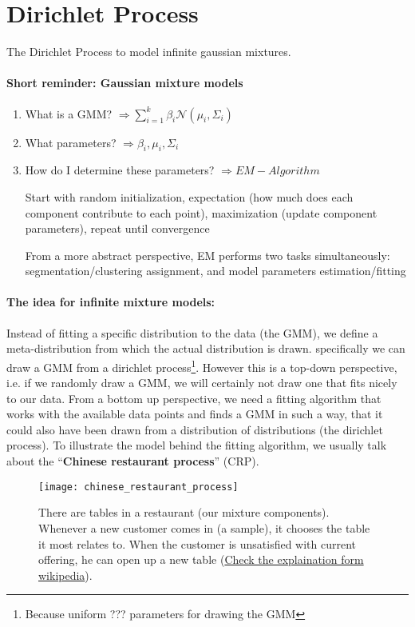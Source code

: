 
\section* {Dirichlet Process}

The Dirichlet Process to model infinite gaussian mixtures.

\paragraph{Short reminder: Gaussian mixture models}
\begin{enumerate}
    \item What is a GMM? \(\Rightarrow \sum_{i=1}^k \beta_i \mathcal{N}(\mu_i, \Sigma_i)\)
    \item What parameters? \(\Rightarrow \beta_i, \mu_i, \Sigma_i\)
    \item How do I determine these parameters? \(\Rightarrow EM-Algorithm\)

          Start with random initialization, expectation (how much does each component contribute to each point), maximization (update component parameters), repeat until convergence

          From a more abstract perspective, EM performs two tasks simultaneously: segmentation/clustering assignment, and model parameters estimation/fitting
\end{enumerate}

\paragraph{The idea for infinite mixture models:}
Instead of fitting a specific distribution to the data (the GMM), we define a meta-distribution from which the actual distribution is drawn.
specifically we can draw a GMM from a dirichlet process\footnote{Because uniform ??? parameters for drawing the GMM}. However this is a top-down perspective, i.e. if we randomly draw a GMM, we will certainly not draw one that fits nicely to our data.
From a bottom up perspective, we need a fitting algorithm that works with the available data points and finds a GMM in such a way, that it could also have been drawn from a distribution of distributions (the dirichlet process).
To illustrate the model behind the fitting algorithm, we usually talk about the ``\textbf{Chinese restaurant process}'' (CRP).

\begin{figure}[H]
	\centering
	\texttt{[image: chinese\_restaurant\_process]}
  \caption{There are tables in a restaurant (our mixture components). Whenever a new customer comes in (a sample), it chooses the table it most relates to. When the customer is unsatisfied with current offering, he can open up a new table (\href{https://en.wikipedia.org/wiki/Chinese_restaurant_process}{Check the explaination form wikipedia}).}
\end{figure}

